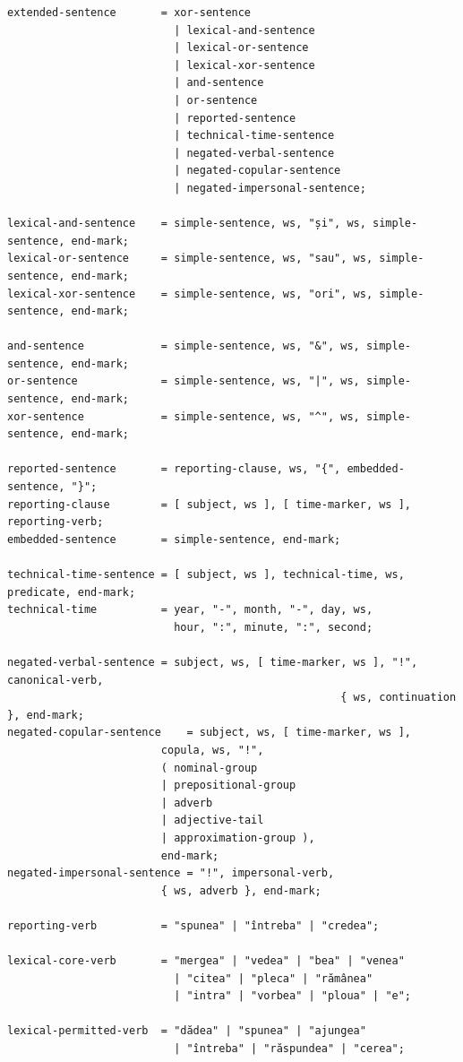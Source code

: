 \documentclass[12pt,onecolumn,letterpaper]{article}
\newcommand{\RSEBNFLayout}{\footnotesize}
\begin{document}
\RSEBNFLayout
\begin{verbatim}
extended-sentence       = xor-sentence
                          | lexical-and-sentence
                          | lexical-or-sentence
                          | lexical-xor-sentence
                          | and-sentence
                          | or-sentence
                          | reported-sentence
                          | technical-time-sentence
                          | negated-verbal-sentence
                          | negated-copular-sentence
                          | negated-impersonal-sentence;

lexical-and-sentence    = simple-sentence, ws, "și", ws, simple-sentence, end-mark;
lexical-or-sentence     = simple-sentence, ws, "sau", ws, simple-sentence, end-mark;
lexical-xor-sentence    = simple-sentence, ws, "ori", ws, simple-sentence, end-mark;

and-sentence            = simple-sentence, ws, "&", ws, simple-sentence, end-mark;
or-sentence             = simple-sentence, ws, "|", ws, simple-sentence, end-mark;
xor-sentence            = simple-sentence, ws, "^", ws, simple-sentence, end-mark;

reported-sentence       = reporting-clause, ws, "{", embedded-sentence, "}";
reporting-clause        = [ subject, ws ], [ time-marker, ws ], reporting-verb;
embedded-sentence       = simple-sentence, end-mark;

technical-time-sentence = [ subject, ws ], technical-time, ws, predicate, end-mark;
technical-time          = year, "-", month, "-", day, ws,
                          hour, ":", minute, ":", second;

negated-verbal-sentence = subject, ws, [ time-marker, ws ], "!", canonical-verb,
                                                    { ws, continuation }, end-mark;
negated-copular-sentence	= subject, ws, [ time-marker, ws ],
						copula, ws, "!",
						( nominal-group
						| prepositional-group
						| adverb
						| adjective-tail
						| approximation-group ),
						end-mark;
negated-impersonal-sentence	= "!", impersonal-verb,
						{ ws, adverb }, end-mark;

reporting-verb          = "spunea" | "întreba" | "credea";

lexical-core-verb       = "mergea" | "vedea" | "bea" | "venea"
                          | "citea" | "pleca" | "rămânea"
                          | "intra" | "vorbea" | "ploua" | "e";

lexical-permitted-verb  = "dădea" | "spunea" | "ajungea"
                          | "întreba" | "răspundea" | "cerea";


\end{verbatim}
\end{document}
